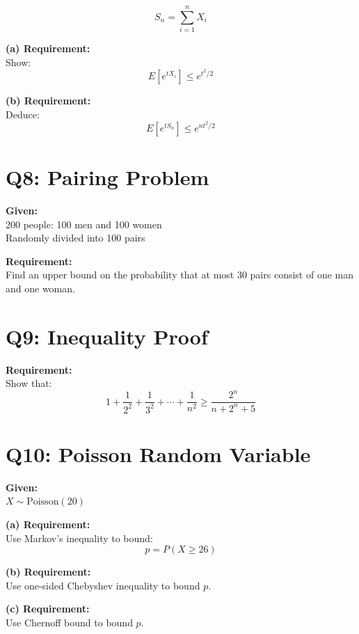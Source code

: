 \documentclass[12pt]{article}
\begin{document}
\[
S_n = \sum_{i=1}^{n} X_i
\]

\textbf{(a) Requirement:} \\
Show:
\[
E[e^{tX_i}] \leq e^{t^2/2}
\]

\textbf{(b) Requirement:} \\
Deduce:
\[
E[e^{tS_n}] \leq e^{nt^2/2}
\]

\section*{Q8: Pairing Problem}

\textbf{Given:} \\
200 people: 100 men and 100 women \\
Randomly divided into 100 pairs

\textbf{Requirement:} \\
Find an upper bound on the probability that at most 30 pairs consist of one man and one woman.

\section*{Q9: Inequality Proof}

\textbf{Requirement:} \\
Show that:
\[
1 + \frac{1}{2^2} + \frac{1}{3^2} + \cdots + \frac{1}{n^2} \geq \frac{2^n}{n + 2^n + 5}
\]

\section*{Q10: Poisson Random Variable}

\textbf{Given:} \\
$X \sim \text{Poisson}(20)$

\textbf{(a) Requirement:} \\
Use Markov’s inequality to bound:
\[
p = P(X \geq 26)
\]

\textbf{(b) Requirement:} \\
Use one-sided Chebyshev inequality to bound $p$.

\textbf{(c) Requirement:} \\
Use Chernoff bound to bound $p$.
\end{document}
